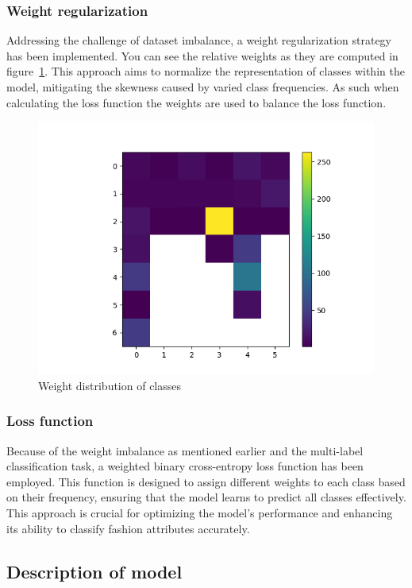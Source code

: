 \documentclass{article}
\begin{document}
\subsubsection{Weight regularization}
Addressing the challenge of dataset imbalance, a weight regularization strategy has been implemented. You can see the relative weights as they are computed in figure~\ref{fig:weight_distribution}. This approach aims to normalize the representation of classes within the model, mitigating the skewness caused by varied class frequencies. As such when calculating the loss function the weights are used to balance the loss function.

\begin{figure}[ht]
    \centering
    \includegraphics[width=0.8\linewidth]{imgs/distribution.png}
    \caption{Weight distribution of classes}
    \label{fig:weight_distribution}
\end{figure}


\subsubsection{Loss function}

Because of the weight imbalance as mentioned earlier and the multi-label classification task, a weighted binary cross-entropy loss function has been employed. This function is designed to assign different weights to each class based on their frequency, ensuring that the model learns to predict all classes effectively. This approach is crucial for optimizing the model's performance and enhancing its ability to classify fashion attributes accurately.

\subsection{Description of model}
\end{document}
